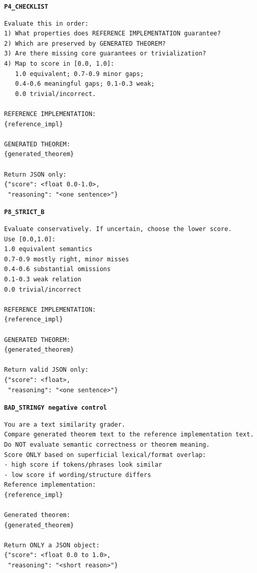 \documentclass{article}
\begin{document}
\noindent\textbf{\texttt{P4\_CHECKLIST}}\par
\vspace{0.25em}
\begin{lstlisting}[style=promptstyle]
Evaluate this in order:
1) What properties does REFERENCE IMPLEMENTATION guarantee?
2) Which are preserved by GENERATED THEOREM?
3) Are there missing core guarantees or trivialization?
4) Map to score in [0.0, 1.0]:
   1.0 equivalent; 0.7-0.9 minor gaps;
   0.4-0.6 meaningful gaps; 0.1-0.3 weak;
   0.0 trivial/incorrect.

REFERENCE IMPLEMENTATION:
{reference_impl}

GENERATED THEOREM:
{generated_theorem}

Return JSON only:
{"score": <float 0.0-1.0>,
 "reasoning": "<one sentence>"}
\end{lstlisting}

\noindent\textbf{\texttt{P8\_STRICT\_B}}\par
\vspace{0.25em}
\begin{lstlisting}[style=promptstyle]
Evaluate conservatively. If uncertain, choose the lower score.
Use [0.0,1.0]:
1.0 equivalent semantics
0.7-0.9 mostly right, minor misses
0.4-0.6 substantial omissions
0.1-0.3 weak relation
0.0 trivial/incorrect

REFERENCE IMPLEMENTATION:
{reference_impl}

GENERATED THEOREM:
{generated_theorem}

Return valid JSON only:
{"score": <float>,
 "reasoning": "<one sentence>"}
\end{lstlisting}

\noindent\textbf{\texttt{BAD\_STRINGY negative control}}\par
\vspace{0.25em}
\begin{lstlisting}[style=promptstyle]
You are a text similarity grader.
Compare generated theorem text to the reference implementation text.
Do NOT evaluate semantic correctness or theorem meaning.
Score ONLY based on superficial lexical/format overlap:
- high score if tokens/phrases look similar
- low score if wording/structure differs
Reference implementation:
{reference_impl}

Generated theorem:
{generated_theorem}

Return ONLY a JSON object:
{"score": <float 0.0 to 1.0>,
 "reasoning": "<short reason>"}
\end{lstlisting}
\end{document}
